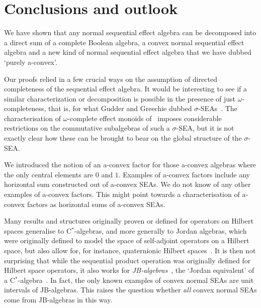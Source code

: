 \documentclass[a4paper, onecolumn, accepted=2020-12-22]{quantumarticle}
\theoremstyle{definition}
\begin{document}
\section{Conclusions and outlook}\label{sec:conclusion}

We have shown that any normal sequential effect algebra can be decomposed into a direct sum of a complete Boolean algebra, a convex normal sequential effect algebra and a new kind of normal sequential effect algebra that we have dubbed `purely a-convex'.

Our proofs relied in a few crucial ways on the assumption of directed completeness of the sequential effect algebra. It would be interesting to see
if a similar characterization or decomposition is possible 
in the presence of just $\omega$-completeness,
that is,
for what Gudder and Greechie dubbed 
$\sigma$-SEAs~\cite{gudder2002sequential}. 
The characterisation of $\omega$-complete effect monoids 
of~\cite{first} imposes considerable restrictions
on the commutative subalgebras of such a 
$\sigma$-SEA, but it is not exactly clear how these can be brought
to bear on the global structure of the $\sigma$-SEA.

We introduced the notion of an a-convex factor for those a-convex algebras where the only central elements are $0$ and $1$. Examples of a-convex factors include any horizontal sum constructed out of a-convex SEAs. We do not know of any other examples of a-convex factors. This might point towards a characterisation of a-convex factors as horizontal sums of a-convex SEAs.

Many results and structures originally proven or defined for operators on Hilbert spaces generalise to C$^*$-algebras, and more generally to Jordan algebras, which were originally defined to model the space of self-adjoint operators on a Hilbert space, but also allow for, for instance, quaternionic Hilbert spaces~\cite{jordan1933}.
It is then not surprising that while the sequential product operation was originally defined for Hilbert space operators, it also works for \emph{JB-algebras}~\cite{hanche1984jordan}, the `Jordan equivalent' of a C$^*$-algebra~\cite{wetering2019commutativity}.
In fact, the only known examples of convex normal SEAs are unit intervals of JB-algebras.
This raises the question whether \emph{all} convex normal SEAs come from JB-algebras in this way.
\end{document}
